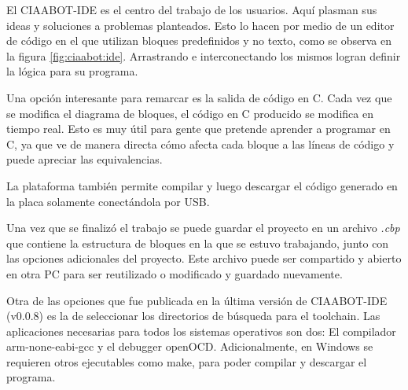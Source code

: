 El CIAABOT-IDE es el centro del trabajo de los usuarios. Aquí plasman sus ideas y soluciones a problemas planteados. Esto lo hacen por medio de un editor de código en el que utilizan bloques predefinidos y no texto, como se observa en la figura \ref{fig:ciaabot:ide}. Arrastrando e interconectando los mismos logran definir la lógica para su programa.

Una opción interesante para remarcar es la salida de código en C. Cada vez que se modifica el diagrama de bloques, el código en C producido se modifica en tiempo real. Esto es muy útil para gente que pretende aprender a programar en C, ya que ve de manera directa cómo afecta cada bloque a las líneas de código y puede apreciar las equivalencias.

La plataforma también permite compilar y luego descargar el código generado en la placa solamente conectándola por USB.

Una vez que se finalizó el trabajo se puede guardar el proyecto en un archivo \emph{.cbp} que contiene la estructura de bloques en la que se estuvo trabajando, junto con las opciones adicionales del proyecto. Este archivo puede ser compartido y abierto en otra PC para ser reutilizado o modificado y guardado nuevamente.

Otra de las opciones que fue publicada en la última versión de CIAABOT-IDE (v0.0.8) es la de seleccionar los directorios de búsqueda para el toolchain. Las aplicaciones necesarias para todos los sistemas operativos son dos: El compilador arm-none-eabi-gcc y el debugger openOCD. Adicionalmente, en Windows se requieren otros ejecutables como make, para poder compilar y descargar el programa.

